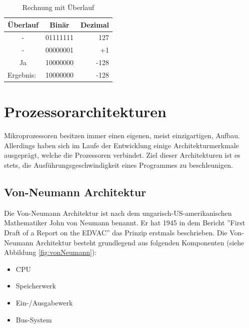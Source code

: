 \documentclass[12pt]{article}
\begin{document}
\begin{table}[!htb]
\centering
\caption{Rechnung mit Überlauf}
\label{my-label}
\begin{tabular}{|c|r|r|}
\hline
\textbf{Überlauf}               & \multicolumn{1}{c|}{\textbf{Binär}} & \multicolumn{1}{c|}{\textbf{Dezimal}} \\ \hline
-                               & 01111111                            & 127                                   \\ \hline
-                               & 00000001                            & +1                                    \\ \hline
Ja                              & 10000000                            & -128                                  \\ \hline\hline
\multicolumn{1}{|l|}{Ergebnis:} & 10000000                            & -128                                  \\ \hline
\end{tabular}
\end{table}

\section{Prozessorarchitekturen}
Mikroprozessoren besitzen immer einen eigenen, meist einzigartigen, Aufbau. Allerdings haben sich im Laufe der Entwicklung einige Architekturmerkmale ausgeprägt, welche die Prozessoren verbindet. 
Ziel dieser Architekturen ist es stets, die Ausführungsgeschwindigkeit eines Programmes zu beschleunigen.
\subsection{Von-Neumann Architektur}
Die Von-Neumann Architektur ist nach dem ungarisch-US-amerikanischen Mathematiker John von Neumann benannt. Er hat 1945 in dem Bericht ''First Draft of a Report on the EDVAC'' das Prinzip erstmals beschrieben.
Die Von-Neumann Architektur besteht grundlegend aus folgenden Komponenten (siehe Abbildung \ref{fig:vonNeumann}):
\begin{itemize}
\item CPU 
\item Speicherwerk 
\item Ein-/Ausgabewerk
\item Bus-System
\end{itemize}
\end{document}
